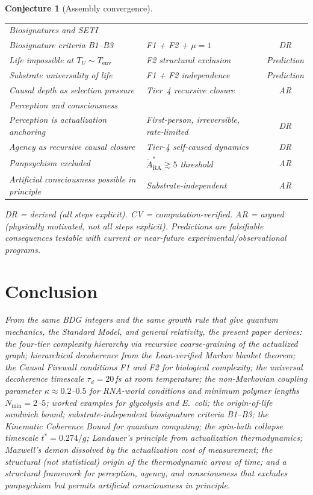 \documentclass[11pt]{article}
\newtheorem{conjecture}{Conjecture}
\begin{document}
\begin{conjecture}[Assembly convergence]
\begin{center}
\begin{tabular}{llc}
\midrule
\multicolumn{3}{l}{\textit{Biosignatures and SETI}} \\
Biosignature criteria B1--B3 & F1 + F2 + $\mu=1$ & DR \\
Life impossible at $T_U\sim T_{\mathrm{env}}$ & F2 structural exclusion & Prediction \\
Substrate universality of life & F1 + F2 independence & Prediction \\
Causal depth as selection pressure & Tier~4 recursive closure & AR \\
\midrule
\multicolumn{3}{l}{\textit{Perception and consciousness}} \\
Perception is actualization anchoring & First-person, irreversible, rate-limited & DR \\
Agency as recursive causal closure & Tier-4 self-caused dynamics & DR \\
Panpsychism excluded & $\tilde{A}_{\mathrm{RA}}^* \gtrsim 5$ threshold & AR \\
Artificial consciousness possible in principle & Substrate-independent & AR \\
\bottomrule
\end{tabular}
\end{center}

DR = derived (all steps explicit). CV = computation-verified. AR = argued (physically motivated, not all steps explicit). Predictions are falsifiable consequences testable with current or near-future experimental/observational programs.

\section{Conclusion}
\label{sec:conclusion}

From the same BDG integers and the same growth rule that give quantum mechanics, the Standard Model, and general relativity, the present paper derives: the four-tier complexity hierarchy via recursive coarse-graining of the actualized graph; hierarchical decoherence from the Lean-verified Markov blanket theorem; the Causal Firewall conditions F1 and F2 for biological complexity; the universal decoherence timescale $\tau_d=20$\,fs at room temperature; the non-Markovian coupling parameter $\kappa\approx 0.2$--$0.5$ for RNA-world conditions and minimum polymer lengths $N_{\min}=2$--$5$; worked examples for glycolysis and \emph{E.~coli}; the origin-of-life sandwich bound; substrate-independent biosignature criteria B1--B3; the Kinematic Coherence Bound for quantum computing; the spin-bath collapse timescale $t^*=0.274/g$; Landauer's principle from actualization thermodynamics; Maxwell's demon dissolved by the actualization cost of measurement; the structural (not statistical) origin of the thermodynamic arrow of time; and a structural framework for perception, agency, and consciousness that excludes panpsychism but permits artificial consciousness in principle.


\end{conjecture}
\end{document}
